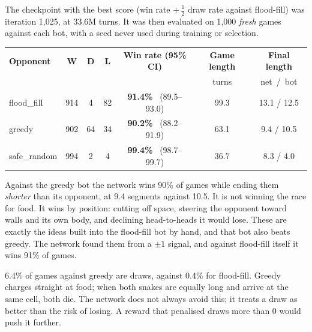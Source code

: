 The checkpoint with the best score (win rate $+\,\tfrac12$ draw rate against flood-fill)
was iteration 1{,}025, at 33.6M turns. It was then evaluated on 1{,}000 \emph{fresh}
games against each bot, with a seed never used during training or selection.

\begin{center}
\begin{tabular}{@{}lcccccc@{}}
\toprule
\textbf{Opponent} & \textbf{W} & \textbf{D} & \textbf{L} & \textbf{Win rate (95\% CI)} &
  \textbf{Game length} & \textbf{Final length}\\
& & & & & \footnotesize turns & \footnotesize net\ /\ bot\\
\midrule
flood\_fill & 914 & 4 & 82 & \textbf{91.4\%} \ (89.5--93.0) & 99.3 & 13.1 / 12.5\\
greedy & 902 & 64 & 34 & \textbf{90.2\%} \ (88.2--91.9) & 63.1 & \hphantom{1}9.4 / 10.5\\
safe\_random & 994 & 2 & 4 & \textbf{99.4\%} \ (98.7--99.7) & 36.7 & \hphantom{1}8.3 / \hphantom{1}4.0\\
\bottomrule
\end{tabular}
\end{center}

\begin{keybox}
Against the greedy bot the network wins 90\% of games while ending them \emph{shorter}
than its opponent, at 9.4 segments against 10.5. It is not winning the race for food. It
wins by position: cutting off space, steering the opponent toward walls and its own
body, and declining head-to-heads it would lose. These are exactly the ideas built into
the flood-fill bot by hand, and that bot also beats greedy. The network found them from a
$\pm1$ signal, and against flood-fill itself it wins 91\% of games.
\end{keybox}

\begin{warnbox}
6.4\% of games against greedy are draws, against 0.4\% for flood-fill. Greedy charges
straight at food; when both snakes are equally long and arrive at the same cell, both
die. The network does not always avoid this; it treats a draw as better than the
risk of losing. A reward that penalised draws more than $0$ would push it further.
\end{warnbox}
